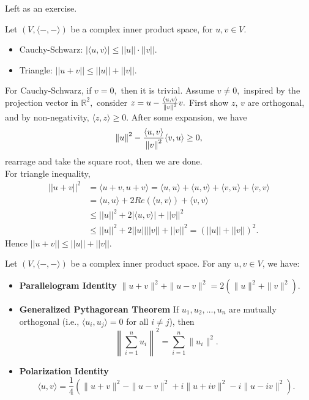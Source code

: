 \begin{pfbox}
    Left as an exercise.
\end{pfbox}

\begin{theorem}
    Let $(V,\langle-,-\rangle)$ be a complex inner product space, for $u,v\in V$.
    \begin{itemize}
        \item Cauchy-Schwarz: $|\langle u,v\rangle| \le ||u||\cdot||v||$.
        \item Triangle: $||u+v||\le||u||+||v||$.
    \end{itemize}
\end{theorem}

\begin{pfbox}
    For Cauchy-Schwarz, if $v=0,$ then it is trivial. Assume $v\neq 0,$ inspired by the projection vector in $\mathbb{R}^2,$ consider $z=u-\frac{\langle u, v\rangle}{\left\lVert v \right\rVert^2}v.$
    First show $z,\,v$ are orthogonal, and by non-negativity, $\langle z,z\rangle\ge 0.$ After some expansion, we have
    $$\left\lVert u \right\rVert^2-\frac{\langle u, v\rangle}{\left\lVert v \right\rVert^2}\langle v, u\rangle \ge 0,$$
    rearrage and take the square root, then we are done.\\ 

    For triangle inequality,
    \begin{align*}
        ||u+v||^{2} &= \langle u+v,u+v\rangle = \langle u,u\rangle+\langle u,v\rangle+\langle v,u\rangle+\langle v,v\rangle \\
        &= \langle u,u\rangle+2Re(\langle u,v\rangle)+\langle v,v\rangle \\
        &\le ||u||^{2}+2|\langle u,v\rangle|+||v||^{2} \\
        &\le ||u||^{2}+2||u||||v||+||v||^{2} = (||u||+||v||)^{2}.
    \end{align*}
    Hence $||u+v||\le||u||+||v||$.
\end{pfbox}


\begin{theorem}
    Let $(V,\langle-,-\rangle)$ be a complex inner product space. For any $u,v\in V$, we have:
    \begin{itemize}
        \item \textbf{Parallelogram Identity} $\|u+v\|^2 + \|u-v\|^2 = 2(\|u\|^2 + \|v\|^2)$.
        \item \textbf{Generalized Pythagorean Theorem} If $u_1, u_2, \dots, u_n$ are mutually orthogonal (i.e., $\langle u_i, u_j\rangle = 0$ for all $i \neq j$), then 
        $$ \left\| \sum_{i=1}^n u_i \right\|^2 = \sum_{i=1}^n \|u_i\|^2. $$
        \item \textbf{Polarization Identity} 
        $$ \langle u,v\rangle = \frac{1}{4} \left( \|u+v\|^2 - \|u-v\|^2 + i\|u+iv\|^2 - i\|u-iv\|^2 \right). $$
    \end{itemize}
\end{theorem}

